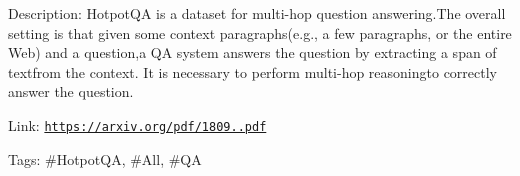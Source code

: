 Description\+: Hotpot\+QA is a dataset for multi-\/hop question answering.\+The overall setting is that given some context paragraphs(e.\+g., a few paragraphs, or the entire Web) and a question,a QA system answers the question by extracting a span of textfrom the context. It is necessary to perform multi-\/hop reasoningto correctly answer the question.

Link\+: \href{https://arxiv.org/pdf/1809.09600.pdf}{\tt https\+://arxiv.\+org/pdf/1809..\+pdf}

Tags\+: \#\+Hotpot\+QA, \#\+All, \#\+QA 